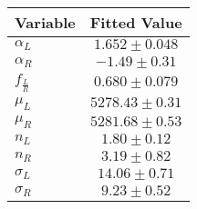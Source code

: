 \begin{tabular}[t]{lc}
\hline
Variable &Fitted Value\\
\hline\hline
$\alpha_L$&$1.652\pm0.048$\\
\hline
$\alpha_R$&$-1.49\pm0.31$\\
\hline
$f_{\frac{L}{R}}$&$0.680\pm0.079$\\
\hline
$\mu_L$&$5278.43\pm0.31$\\
\hline
$\mu_R$&$5281.68\pm0.53$\\
\hline
$n_L$&$1.80\pm0.12$\\
\hline
$n_R$&$3.19\pm0.82$\\
\hline
$\sigma_L$&$14.06\pm0.71$\\
\hline
$\sigma_R$&$9.23\pm0.52$\\
\hline
\end{tabular}